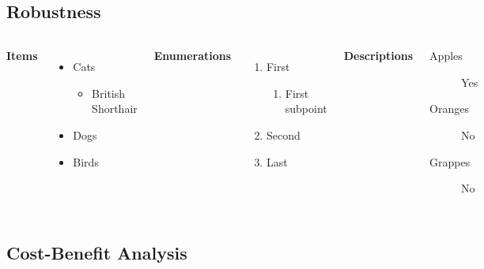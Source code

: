 \documentclass[
11pt,notheorems,compress,hyperref={pdfauthor=Maghfira Ramadhani}
]{beamer}
\begin{document}
\subsection{Robustness}
\begin{frame}
    \begin{columns}[T,onlytextwidth]
      \textbf{Items}
      \begin{itemize}
        \item Cats 
        \begin{itemize}
            \item British Shorthair
        \end{itemize}
        \item Dogs \item Birds
      \end{itemize}

      \textbf{Enumerations}
      \begin{enumerate}
        \item First 
        \begin{enumerate}
            \item First subpoint
        \end{enumerate}
        \item Second \item Last
      \end{enumerate}

      \textbf{Descriptions}
      \begin{description}
        \item[Apples] Yes \item[Oranges] No \item[Grappes] No
      \end{description}
\end{columns}
\end{frame}

\subsection{Cost-Benefit Analysis}
\begin{frame}
    
\end{frame}
\end{document}
